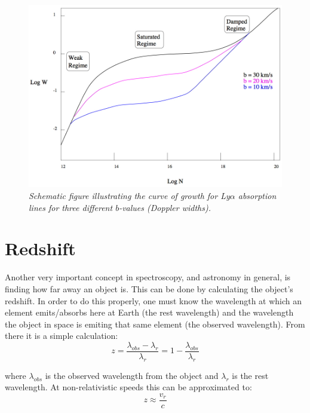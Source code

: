 \begin{center}
\begin{figure}[htbp]
\begin{center}
\includegraphics[scale=0.28, angle=0.0]{fig_cog.jpg}
\caption{\textsl{Schematic figure illustrating the curve of growth for Ly$\alpha$ absorption lines for three different $b$-values (Doppler widths).}}\label{fig:cog}
\end{center}
\end{figure}
\end{center}

\section{Redshift}

Another very important concept in spectroscopy, and astronomy in general, is finding how far away an object is. This can be done by calculating the object's redshift. In order to do this properly, one must know the wavelength at which an element emits/absorbs here at Earth (the rest wavelength) and the wavelength the object in space is emiting that same element (the observed wavelength). From there it is a simple calculation:
\begin{equation}
    z = \frac{\lambda_{obs} - \lambda_r}{\lambda_r} = 1 - \frac{\lambda_{obs}}{\lambda_r}
\end{equation} 

where $\lambda_{obs}$ is the observed wavelength from the object and $\lambda_r$ is the rest wavelength. At non-relativistic speeds this can be approximated to:
\begin{equation}
    z \approx \frac{v_r}{c}
\end{equation}

